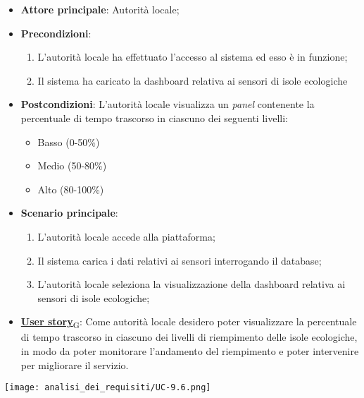 \begin{itemize}
	\item \textbf{Attore principale}: Autorità locale;
	\item \textbf{Precondizioni}:
	      \begin{enumerate}
		      \item L'autorità locale ha effettuato l'accesso al sistema ed esso è in funzione;
		      \item Il sistema ha caricato la dashboard relativa ai sensori di isole ecologiche
	      \end{enumerate}
	\item \textbf{Postcondizioni}: L'autorità locale visualizza un \textit{panel} contenente la percentuale di tempo trascorso in ciascuno dei seguenti livelli:
	      \begin{itemize}
		      \item Basso (0-50\%)
		      \item Medio (50-80\%)
		      \item Alto (80-100\%)
	      \end{itemize}
	\item \textbf{Scenario principale}:
	      \begin{enumerate}
		      \item L'autorità locale accede alla piattaforma;
		      \item Il sistema carica i dati relativi ai sensori interrogando il database;
		      \item L'autorità locale seleziona la visualizzazione della dashboard relativa ai sensori di isole ecologiche;
	      \end{enumerate}
	\item \href{https://7last.github.io/docs/rtb/documentazione-interna/glossario\#user-story}{\textbf{User story}\textsubscript{G}}:
	      Come autorità locale desidero poter visualizzare la percentuale di tempo trascorso in ciascuno dei livelli di riempimento delle isole ecologiche,
	      in modo da poter monitorare l'andamento del riempimento e poter intervenire per migliorare il servizio.
\end{itemize}
\begin{center}
	\texttt{[image: analisi\_dei\_requisiti/UC-9.6.png]}
\end{center}


